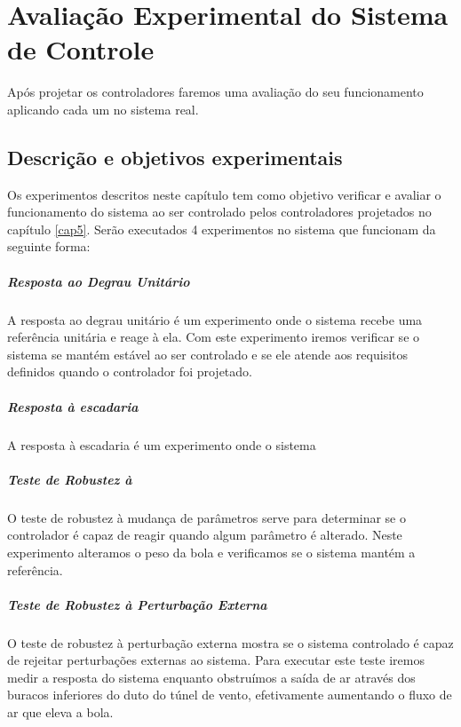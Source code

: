 \chapter{Avaliação Experimental do Sistema de Controle}\label{cap6}
Após projetar os controladores faremos uma avaliação do seu funcionamento aplicando cada um no sistema real.
\section{Descrição e objetivos experimentais}
Os experimentos descritos neste capítulo tem como objetivo verificar e avaliar o funcionamento do sistema ao ser controlado pelos controladores projetados no capítulo \ref{cap5}. Serão executados 4 experimentos no sistema que funcionam da seguinte forma:
\paragraph{Resposta ao Degrau Unitário} A resposta ao degrau unitário é um experimento onde o sistema recebe uma referência unitária e reage à ela. Com este experimento iremos verificar se o sistema se mantém estável ao ser controlado e se ele atende aos requisitos  definidos quando o controlador foi projetado.
\paragraph{Resposta à escadaria} A resposta à escadaria é um experimento onde o sistema 

\paragraph{Teste de Robustez à  }

O teste de robustez à mudança de parâmetros serve para determinar se o controlador é capaz de reagir quando algum parâmetro é alterado. Neste experimento alteramos o peso da bola e verificamos se o sistema mantém a referência. 

\paragraph{Teste de Robustez à Perturbação Externa}
  O teste de robustez à perturbação externa mostra se o sistema controlado é capaz de rejeitar perturbações externas ao sistema. Para executar este teste iremos medir a resposta do sistema enquanto obstruímos a saída de ar através dos buracos inferiores do duto do túnel de vento, efetivamente aumentando o fluxo de ar que eleva a bola.

